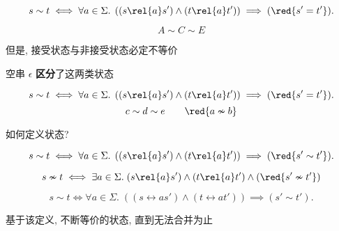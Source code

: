 \begin{frame}{}
  \[
    s \sim t \iff \forall a \in \Sigma.\; 
      \left((s \rel{a} s') \land (t \rel{a} t')\right) \implies (\red{s' = t'}).
  \]
  

  \vspace{-0.30cm}
  \[
    A \sim C \sim E
  \]

  \pause
  \vspace{0.20cm}
  \begin{center}
    但是, 接受状态与非接受状态必定不等价

    \vspace{0.30cm}
    空串 $\epsilon$ {\bf 区分}了这两类状态
  \end{center}
\end{frame}

\begin{frame}{}
  \[
    s \sim t \iff \forall a \in \Sigma.\; 
      \left((s \rel{a} s') \land (t \rel{a} t')\right) \implies (\red{s' = t'}).
  \]
  \[
    c \sim d \sim e \qquad \red{a \nsim b}
  \]
\end{frame}

\begin{frame}{}
  \begin{center}
    如何定义状态?
  \end{center}


  \[
    s \sim t \iff \forall a \in \Sigma.\; 
      \left((s \rel{a} s') \land (t \rel{a} t')\right) \implies (\red{s' \sim t'}).
  \]

  \pause
  \[
    s \nsim t \iff \exists a \in \Sigma.\;
      (s \rel{a} s') \land (t \rel{a} t') \land (\red{s' \nsim t'})
  \]
\end{frame}

\begin{frame}{}
  \begin{center}
    \[
      s \sim t \iff \forall a \in \Sigma.\; 
        \left((s \rel{a} s') \land (t \rel{a} t')\right) \implies (s' \sim t').
    \]

    基于该定义, 不断等价的状态, 直到无法合并为止

    \pause
    \vspace{0.80cm}

    \pause
    \vspace{0.80cm}

    \pause
    \vspace{0.50cm}
  \end{center}
\end{frame}

